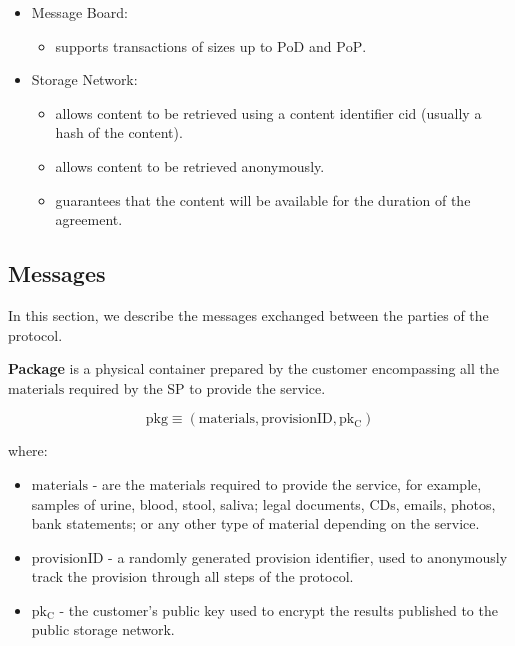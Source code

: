 \documentclass[pdftex,twocolumn,epjc3]{svjour3}
\begin{document}
{\begin{itemize}
\item Message Board:
    \begin{itemize}
        \item supports transactions of sizes up to $\mathrm{PoD}$ and $\mathrm{PoP}$.
    \end{itemize}

\item Storage Network:
    \begin{itemize}
        \item allows content to be retrieved using a content identifier $\mathrm{cid}$ (usually a hash of the content).
        \item allows content to be retrieved anonymously.
        \item guarantees that the content will be available for the duration of the agreement.
    \end{itemize}
\end{itemize}

\subsection{Messages}\label{messages}
In this section, we describe the messages exchanged between the parties of the protocol.

\vspace{5mm}

\noindent \textbf
{Package}\label{package} is a physical container prepared by the customer encompassing all the $\mathrm{materials}$ required by the SP to provide the service.

$$\mathrm{pkg} \equiv (\mathrm{materials}, \mathrm{provisionID}, \mathrm{pk_C})$$

where:

\begin{itemize}

\item $\mathrm{materials}$ - are the materials required to provide the service, for example, samples of urine, blood, stool, saliva; legal documents, CDs, emails, photos, bank statements; or any other type of material depending on the service.
\item $\mathrm{provisionID}$ - a randomly generated provision identifier, used to anonymously track the provision through all steps of the protocol.
\item $\mathrm{pk_C}$ - the customer's public key used to encrypt the results published to the public storage network.
\end{itemize}

}
\end{document}
